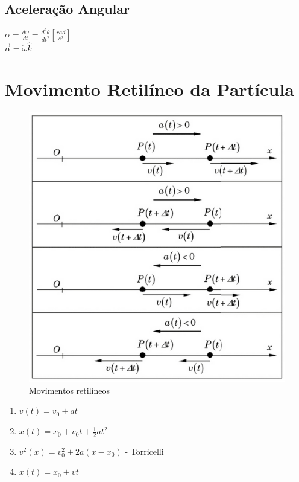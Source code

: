 \documentclass[a4paper, 12pt]{article}
\begin{document}
	\subsection{Aceleração Angular}
		\begin{center}
			\Large			
			$
			\alpha = \frac{d\omega}{dt} = \frac{d^2\theta}{dt^2}[\frac{rad}{s^2}]	
			$\\
			$
			\vec{\alpha} = \ddot{\omega}\hat{k}
			$			
			
		\end{center}

\section{Movimento Retilíneo da Partícula}
	\begin{figure}[h]
		\center
		\includegraphics[scale=0.45]{imagens/mr.png} 
		\caption{Movimentos retilíneos}
	\end{figure}		
	
	\begin{enumerate}
		\item $v(t) = v_0 + at$
		\item $x(t) = x_0 + v_0t + \frac{1}{2}at^2$
		\item $v^2(x) = v_0^2+2a(x-x_0)$ - Torricelli
		\item $x(t) = x_0 + vt$
	\end{enumerate}
\end{document}
